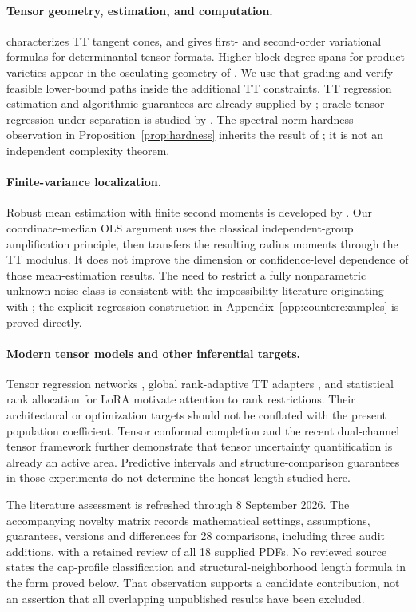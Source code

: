 \paragraph{Tensor geometry, estimation, and computation.}
\citet{kutschan2018} characterizes TT tangent cones, and \citet{yang2025} gives first- and second-order variational formulas for determinantal tensor formats. Higher block-degree spans for product varieties appear in the osculating geometry of \citet{araujo2019}. We use that grading and verify feasible lower-bound paths inside the additional TT constraints. TT regression estimation and algorithmic guarantees are already supplied by \citet{qin2025}; oracle tensor regression under separation is studied by \citet{wang2025}. The spectral-norm hardness observation in Proposition~\ref{prop:hardness} inherits the result of \citet{hillarlim2013}; it is not an independent complexity theorem.

\paragraph{Finite-variance localization.}
Robust mean estimation with finite second moments is developed by \citet{devroye2016,lugosi2019}. Our coordinate-median OLS argument uses the classical independent-group amplification principle, then transfers the resulting radius moments through the TT modulus. It does not improve the dimension or confidence-level dependence of those mean-estimation results. The need to restrict a fully nonparametric unknown-noise class is consistent with the impossibility literature originating with \citet{bahadur1956}; the explicit regression construction in Appendix~\ref{app:counterexamples} is proved directly.

\paragraph{Modern tensor models and other inferential targets.}
Tensor regression networks \citep{kossaifi2020}, global rank-adaptive TT adapters \citep{metatt2026}, and statistical rank allocation for LoRA \citep{gao2026} motivate attention to rank restrictions. Their architectural or optimization targets should not be conflated with the present population coefficient. Tensor conformal completion \citep{suncheng2026} and the recent dual-channel tensor framework \citep{dual2026} further demonstrate that tensor uncertainty quantification is already an active area. Predictive intervals and structure-comparison guarantees in those experiments do not determine the honest length studied here.

The literature assessment is refreshed through 8 September 2026. The accompanying novelty matrix records mathematical settings, assumptions, guarantees, versions and differences for 28 comparisons, including three audit additions, with a retained review of all 18 supplied PDFs. No reviewed source states the cap-profile classification and structural-neighborhood length formula in the form proved below. That observation supports a candidate contribution, not an assertion that all overlapping unpublished results have been excluded.
